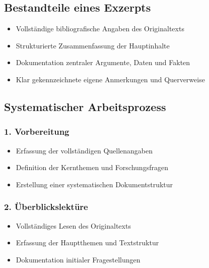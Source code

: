 \documentclass{vorlage-design-main}
\begin{document}
\subsection{Bestandteile eines
Exzerpts}\label{bestandteile-eines-exzerpts}

\begin{itemize}

\item
  Vollständige bibliografische Angaben des Originaltexts
\item
  Strukturierte Zusammenfassung der Hauptinhalte
\item
  Dokumentation zentraler Argumente, Daten und Fakten
\item
  Klar gekennzeichnete eigene Anmerkungen und Querverweise
\end{itemize}

\subsection{Systematischer
Arbeitsprozess}\label{systematischer-arbeitsprozess}

\subsubsection{1. Vorbereitung}\label{vorbereitung}

\begin{itemize}

\item
  Erfassung der vollständigen Quellenangaben
\item
  Definition der Kernthemen und Forschungsfragen
\item
  Erstellung einer systematischen Dokumentstruktur
\end{itemize}

\subsubsection{2. Überblickslektüre}\label{ueberblickslektuere}

\begin{itemize}

\item
  Vollständiges Lesen des Originaltexts
\item
  Erfassung der Hauptthemen und Textstruktur
\item
  Dokumentation initialer Fragestellungen
\end{itemize}
\end{document}
